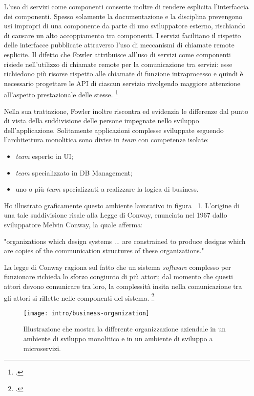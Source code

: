 L'uso di servizi come componenti consente inoltre di rendere esplicita l'interfaccia dei componenti.
Spesso solamente la documentazione e la disciplina prevengono usi impropri di una componente da parte di uno sviluppatore esterno, rischiando di causare un alto accoppiamento tra componenti.
I servizi facilitano il rispetto delle interfacce pubblicate attraverso l'uso di meccanismi di chiamate remote esplicite.
Il difetto che Fowler attribuisce all'uso di servizi come componenti risiede nell'utilizzo di chiamate remote per la comunicazione tra servizi:
esse richiedono più risorse rispetto alle chiamate di funzione intraprocesso e quindi è necessario progettare le API di ciascun servizio rivolgendo maggiore attenzione all'aspetto prestazionale delle stesse.
\footcite{site:fowler-microservices}

Nella sua trattazione, Fowler inoltre riscontra ed evidenzia le differenze dal punto di vista della suddivisione delle persone impegnate nello sviluppo dell'applicazione.
Solitamente applicazioni complesse sviluppate seguendo l'architettura monolitica sono divise in \emph{team} con competenze isolate:

\begin{itemize}
  \item \emph{team} esperto in UI;
  \item \emph{team} specializzato in DB Management;
  \item uno o più \emph{team} specializzati a realizzare la logica di business.
\end{itemize}

Ho illustrato graficamente questo ambiente lavorativo in figura ~\ref{fig:business-organization}.
L'origine di una tale suddivisione risale alla Legge di Conway, enunciata nel 1967 dallo sviluppatore Melvin Conway, la quale afferma:
\begin{displayquote}
  "organizations which design systems ... are constrained to produce designs which are copies of the communication structures of these organizations."
\end{displayquote}

La legge di Conway ragiona sul fatto che un sistema \emph{software} complesso per funzionare richieda lo sforzo congiunto di più attori; dal momento che questi attori devono comunicare tra loro, la complessità insita nella comunicazione tra gli attori si riflette nelle componenti del sistema.
\footcite{site:conway}

\begin{figure}[H]
  \centering
  \texttt{[image: intro/business-organization]}
  \caption{Illustrazione che mostra la differente organizzazione aziendale in un ambiente di sviluppo monolitico e in un ambiente di sviluppo a microservizi.\\ \cite{site:fowler-microservices}}
  \label{fig:business-organization}
\end{figure}

